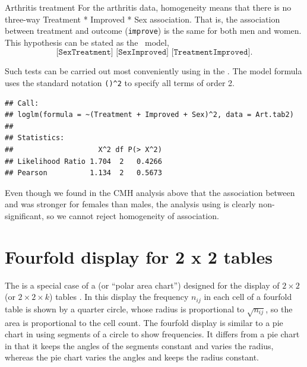 \documentclass[11pt]{book}
\renewenvironment{knitrout}{\small\renewcommand{\baselinestretch}{.85}}{} %
\begin{document}
\begin{Example}[arthrit4]{Arthritis treatment}
For the arthritis data, homogeneity means that there is no three-way
Treatment * Improved * Sex association.  That is, the association
between treatment and outcome (\texttt{improve})
is the same for both men and women.
This hypothesis can be stated
as the \loglin\ model,
\begin{equation}\label{eq:STO2}
 \texttt{[SexTreatment] [SexImproved] [TreatmentImproved]}
 \period
\end{equation}

Such tests can be carried out most conveniently using
 in the .  The model formula
uses the standard \R notation \verb|()^2| to specify all
terms of order 2.
\begin{knitrout}
\color{fgcolor}\begin{kframe}
\begin{alltt}
\hlstd{(}\hlopt{~}  \hlopt{+}  \hlopt{+} \hlopt{^}\hlstd{,} 
\end{alltt}
\begin{verbatim}
## Call:
## loglm(formula = ~(Treatment + Improved + Sex)^2, data = Art.tab2)
## 
## Statistics:
##                    X^2 df P(> X^2)
## Likelihood Ratio 1.704  2   0.4266
## Pearson          1.134  2   0.5673
\end{verbatim}
\end{kframe}
\end{knitrout}
Even though we found in the CMH analysis above that the
association between  and 
was stronger for females than males, the analysis using
 is clearly non-significant, so we cannot
reject homogeneity of association.
\end{Example}


\section{Fourfold display for 2 x 2 tables}\label{sec:twoway-fourfold}

The  is a special case of a
 (or ``polar area chart'')
designed for the display of $2 \times 2$ (or $2 \times 2 \times k$)
tables
\citep{Fienberg:75,Friendly:94b,Friendly:94c}.
In this display the frequency
\(n_{ij}\) in each cell of a fourfold table is shown by a quarter
circle, whose radius is proportional to \(\sqrt { n_{ij} }\), so the
area is proportional to the cell count.
The fourfold display
is similar to a pie chart in using segments of
a circle to show frequencies.  It
differs from a pie chart in that it keeps the
angles of the segments constant and varies the radius,
whereas the pie chart varies the angles and keeps the radius constant.
\end{document}
